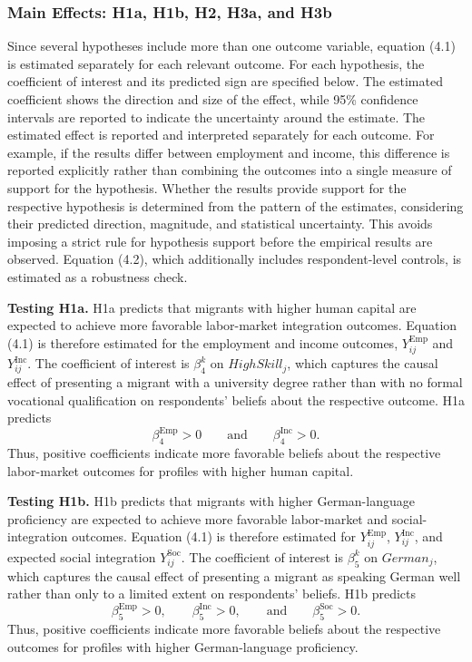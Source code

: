 \subsubsection{Main Effects: H1a, H1b, H2, H3a, and H3b}

Since several hypotheses include more than one outcome variable, equation (4.1) is estimated separately for each relevant 
outcome. For each hypothesis, the coefficient of interest and its predicted sign are specified below. The estimated 
coefficient shows the direction and size of the effect, while 95\% confidence intervals are reported to indicate the 
uncertainty around the estimate. The estimated effect is reported and interpreted separately for each outcome. For 
example, if the results differ between employment and income, this difference is reported explicitly rather than 
combining the outcomes into a single measure of support for the hypothesis. Whether the results provide support for 
the respective hypothesis is determined from the pattern of the estimates, considering their predicted 
direction, magnitude, and statistical uncertainty. This avoids imposing a strict rule for hypothesis support before 
the empirical results are observed. Equation (4.2), which additionally includes respondent-level controls, is estimated 
as a robustness check.\bigskip

\noindent\textbf{Testing H1a.} H1a predicts that migrants with higher human capital are expected to achieve more 
favorable labor-market integration outcomes. Equation (4.1) is therefore estimated for the employment and income 
outcomes, \(Y_{ij}^{\mathrm{Emp}}\) and \(Y_{ij}^{\mathrm{Inc}}\). The coefficient of interest is \(\beta_{4}^{k}\) on \(HighSkill_j\), 
which captures the causal effect of presenting a migrant with a university degree rather than with no formal vocational 
qualification on respondents’ beliefs about the respective outcome. H1a predicts
$$ \beta_{4}^{\mathrm{Emp}}>0 \qquad \text{and} \qquad \beta_{4}^{\mathrm{Inc}}>0. $$
Thus, positive coefficients indicate more favorable beliefs about the respective labor-market outcomes for profiles 
with higher human capital.\bigskip

\noindent\textbf{Testing H1b.} H1b predicts that migrants with higher German-language proficiency are expected to 
achieve more favorable labor-market and social-integration outcomes. Equation (4.1) is therefore estimated for
\(Y_{ij}^{\mathrm{Emp}}\), \(Y_{ij}^{\mathrm{Inc}}\), and expected social integration \(Y_{ij}^{\mathrm{Soc}}\). 
The coefficient of interest is \(\beta_{5}^{k}\) on \(German_j\), which captures the causal effect of presenting a 
migrant as speaking German well rather than only to a limited extent on respondents’ beliefs. H1b predicts
$$ \beta_{5}^{\mathrm{Emp}}>0, \qquad \beta_{5}^{\mathrm{Inc}}>0, \qquad \text{and} \qquad \beta_{5}^{\mathrm{Soc}}>0. $$
Thus, positive coefficients indicate more favorable beliefs about the respective outcomes for profiles with higher 
German-language proficiency.\bigskip

